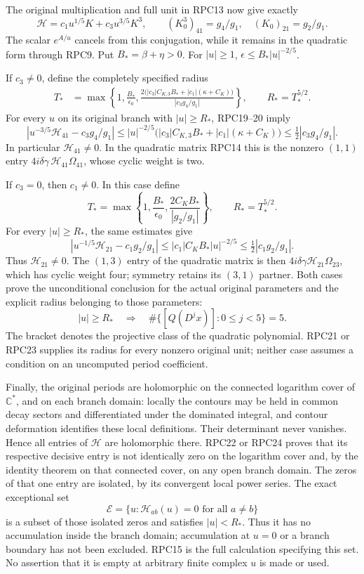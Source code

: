 The original multiplication and full unit in RPC13 now give exactly
\[
 \mathcal H=c_1u^{1/5}K+c_3u^{3/5}K^3,
 \qquad (K_0^3)_{41}=g_4/g_1,\quad (K_0)_{21}=g_2/g_1.
 \tag{RPC20}
\]
The scalar $e^{A/u}$ cancels from this conjugation, while it remains
in the quadratic form through RPC9. Put $B_*=\beta+\eta>0$.
For $|u|\ge1$, $\epsilon\le B_*|u|^{-2/5}$.

If $c_3\ne0$, define the completely specified radius
\[
 \begin{split}
 T_*&=\max\left\{1,\frac{B_*}{\epsilon_0},
 \frac{2\bigl(|c_3|C_{K,3}B_*+|c_1|(\kappa+C_K)\bigr)}
 {|c_3g_4/g_1|}\right\},\qquad R_*=T_*^{5/2}.
 \end{split}
 \tag{RPC21}
\]
For every $u$ on its original branch with $|u|\ge R_*$,
RPC19--20 imply
\[
 \left|u^{-3/5}\mathcal H_{41}-c_3g_4/g_1\right|
 \le |u|^{-2/5}\bigl(|c_3|C_{K,3}B_*
                           +|c_1|(\kappa+C_K)\bigr)
 \le\tfrac12|c_3g_4/g_1|.
 \tag{RPC22}
\]
In particular $\mathcal H_{41}\ne0$. In the quadratic matrix
RPC14 this is the nonzero $(1,1)$ entry
$4i\delta\gamma\,\mathcal H_{41}\Omega_{41}$, whose cyclic
weight is two.

If $c_3=0$, then $c_1\ne0$. In this case define
\[
 T_* =\max\left\{1,\frac{B_*}{\epsilon_0},
                   \frac{2C_KB_*}{|g_2/g_1|}\right\},
 \qquad R_*=T_*^{5/2}.
 \tag{RPC23}
\]
For every $|u|\ge R_*$, the same estimates give
\[
 \left|u^{-1/5}\mathcal H_{21}-c_1g_2/g_1\right|
       \le |c_1|C_KB_*|u|^{-2/5}
       \le\tfrac12|c_1g_2/g_1|.
 \tag{RPC24}
\]
Thus $\mathcal H_{21}\ne0$. The $(1,3)$ entry of the quadratic
matrix is then $4i\delta\gamma\mathcal H_{21}\Omega_{23}$,
which has cyclic weight four; symmetry retains its $(3,1)$ partner.
Both cases prove the unconditional conclusion for the actual original
parameters and the explicit radius belonging to those parameters:
\[
 \boxed{\quad |u|\ge R_*\quad\Longrightarrow\quad
       \#\{[Q(D^jx)]:0\le j<5\}=5.\quad}
 \tag{RPC25}
\]
The bracket denotes the projective class of the quadratic polynomial.
RPC21 or RPC23 supplies its radius for every nonzero original unit;
neither case assumes a condition on an uncomputed period coefficient.

Finally, the original periods are holomorphic on the connected
logarithm cover of $\mathbb C^*$, and on each branch domain: locally the contours may
be held in common decay sectors and differentiated under the dominated
integral, and contour deformation identifies these local definitions.
Their determinant never vanishes. Hence all entries of $\mathcal H$
are holomorphic there. RPC22 or RPC24 proves that its respective
decisive entry is not identically zero on the logarithm cover and,
by the identity theorem on that connected cover, on any open branch domain. The zeros
of that one entry are isolated, by its convergent local power series.
The exact exceptional set
\[
 \mathcal E=\{u:\mathcal H_{ab}(u)=0\text{ for all }a\ne b\}
 \tag{RPC26}
\]
is a subset of those isolated zeros and satisfies $|u|<R_*$.
Thus it has no accumulation inside the branch domain; accumulation
at $u=0$ or a branch boundary has not been excluded. RPC15 is the
full calculation specifying this set. No assertion that it is empty
at arbitrary finite complex $u$ is made or used.

